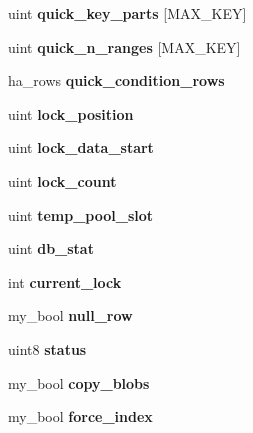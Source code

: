 \begin{DoxyCompactItemize}
uint {\bfseries quick\+\_\+key\+\_\+parts} \mbox{[}M\+A\+X\+\_\+\+K\+EY\mbox{]}
\item 
\mbox{\label{structTABLE_a8a3695f54245f5a73f671663a2c42539}} 
uint {\bfseries quick\+\_\+n\+\_\+ranges} \mbox{[}M\+A\+X\+\_\+\+K\+EY\mbox{]}
\item 
\mbox{\label{structTABLE_a3d9c3fea2f799efd5dfc4e032616ef7a}} 
ha\+\_\+rows {\bfseries quick\+\_\+condition\+\_\+rows}
\item 
\mbox{\label{structTABLE_a8f369ea55cf38c5a4986a7f4c32c2ac4}} 
uint {\bfseries lock\+\_\+position}
\item 
\mbox{\label{structTABLE_a4a14b51619ae1cc39114004c1b231860}} 
uint {\bfseries lock\+\_\+data\+\_\+start}
\item 
\mbox{\label{structTABLE_adb3a535f4642bd789d550c66bde50a66}} 
uint {\bfseries lock\+\_\+count}
\item 
\mbox{\label{structTABLE_ac9f4c2d452c3d8f5491ca6e3f9573989}} 
uint {\bfseries temp\+\_\+pool\+\_\+slot}
\item 
\mbox{\label{structTABLE_a5c0ed73ef7b67cf2c3a5de7cf02a8048}} 
uint {\bfseries db\+\_\+stat}
\item 
\mbox{\label{structTABLE_a87e2168d71994bc754d3a5ffc7718e86}} 
int {\bfseries current\+\_\+lock}
\item 
\mbox{\label{structTABLE_a44fcf0051d0edc646b261c7c1a6d56ba}} 
my\+\_\+bool {\bfseries null\+\_\+row}
\item 
\mbox{\label{structTABLE_abb2eaffbfa8f9f6b8bc642322388c16a}} 
uint8 {\bfseries status}
\item 
\mbox{\label{structTABLE_a4406735595e9dc27dc9903c0a8d192f9}} 
my\+\_\+bool {\bfseries copy\+\_\+blobs}
\item 
\mbox{\label{structTABLE_ae2916c452b9046268d07722158b546dd}} 
my\+\_\+bool {\bfseries force\+\_\+index}
\item 

\end{DoxyCompactItemize}

